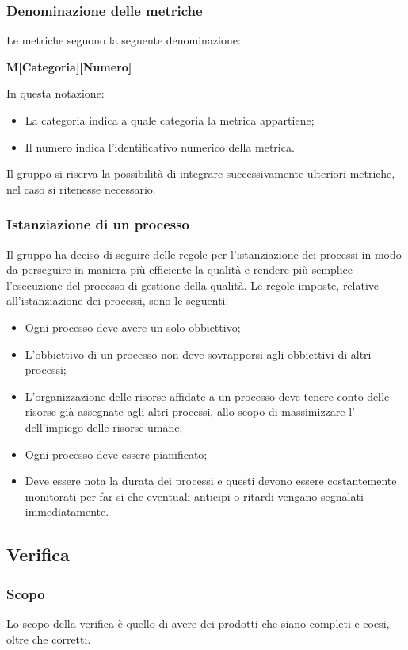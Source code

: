 \subsubsection{Denominazione delle metriche}
Le metriche seguono la seguente denominazione:
\begin{center}
    \textbf{M[Categoria][Numero]}
\end{center}
In questa notazione:
\begin{itemize}
    \item La categoria indica a quale categoria la metrica appartiene;
    \item Il numero indica l'identificativo numerico della metrica.
\end{itemize}
Il gruppo si riserva la possibilità di integrare successivamente ulteriori metriche, nel caso si ritenesse necessario.

\subsubsection{Istanziazione di un processo}
Il gruppo ha deciso di seguire delle regole per l'istanziazione dei processi in modo da perseguire in maniera più 
efficiente la qualità e rendere più semplice l'esecuzione del processo di gestione della qualità. Le regole imposte, 
relative all'istanziazione dei processi, sono le seguenti:
\begin{itemize}
    \item Ogni processo deve avere un solo obbiettivo;
    \item L'obbiettivo di un processo non deve sovrapporsi agli obbiettivi di altri processi;
    \item L'organizzazione delle risorse affidate a un processo deve tenere conto delle risorse già assegnate agli 
    altri processi, allo scopo di massimizzare l' dell'impiego delle risorse umane;
    \item Ogni processo deve essere pianificato;
    \item Deve essere nota la durata dei processi e questi devono essere costantemente monitorati per far si che 
    eventuali anticipi o ritardi vengano segnalati immediatamente.
\end{itemize}

\subsection{Verifica}

\subsubsection{Scopo}
Lo scopo della verifica è quello di avere dei prodotti che siano completi e coesi, oltre che corretti.

